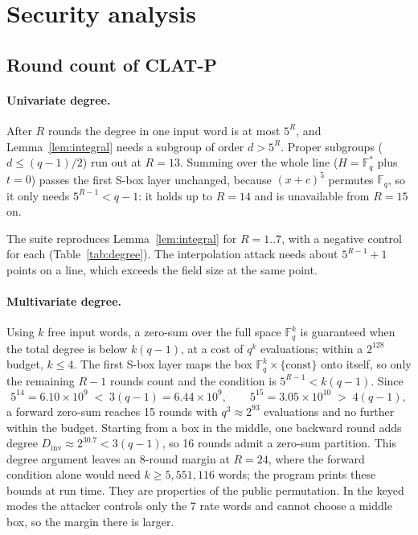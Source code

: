 \documentclass[10pt,a4paper]{article}
\newcommand{\Fq}{\mathbb{F}_q}
\theoremstyle{definition}
\theoremstyle{remark}
\begin{document}
\section{Security analysis}

\subsection{Round count of CLAT-P}\label{sec:roundcount}

\paragraph{Univariate degree.}
After $R$ rounds the degree in one input word is at most $5^R$, and Lemma~\ref{lem:integral} needs a subgroup of order $d > 5^R$. Proper subgroups ($d \le (q-1)/2$) run out at $R = 13$. Summing over the whole line ($H = \Fq^*$ plus $t = 0$) passes the first S-box layer unchanged, because $(x+c)^5$ permutes $\Fq$, so it only needs $5^{R-1} < q-1$: it holds up to $R = 14$ and is unavailable from $R = 15$ on.

The suite reproduces Lemma~\ref{lem:integral} for $R = 1..7$, with a negative control for each (Table~\ref{tab:degree}). The interpolation attack needs about $5^{R-1}+1$ points on a line, which exceeds the field size at the same point.

\paragraph{Multivariate degree.}
Using $k$ free input words, a zero-sum over the full space $\Fq^k$ is guaranteed when the total degree is below $k(q-1)$, at a cost of $q^k$ evaluations; within a $2^{128}$ budget, $k \le 4$. The first S-box layer maps the box $\Fq^k\times\{\text{const}\}$ onto itself, so only the remaining $R-1$ rounds count and the condition is $5^{R-1} < k(q-1)$. Since
\[
  5^{14} = 6.10\times10^{9} \;<\; 3(q-1) = 6.44\times 10^{9}, \qquad 5^{15} = 3.05\times10^{10} \;>\; 4(q-1),
\]
a forward zero-sum reaches 15 rounds with $q^3\approx2^{93}$ evaluations and no further within the budget. Starting from a box in the middle, one backward round adds degree $D_{\mathrm{inv}}\approx2^{30.7} < 3(q-1)$, so 16 rounds admit a zero-sum partition. This degree argument leaves an 8-round margin at $R=24$, where the forward condition alone would need $k \ge 5{,}551{,}116$ words; the program prints these bounds at run time. They are properties of the public permutation. In the keyed modes the attacker controls only the 7 rate words and cannot choose a middle box, so the margin there is larger.
\end{document}

